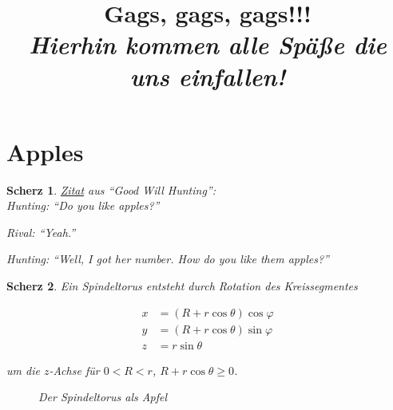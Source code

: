 \documentclass{article}
\title
{
  Gags, gags, gags!!! \\
  \vspace{4pt}
  \normalsize
  \textit{Hierhin kommen alle Späße die uns einfallen!}
}
\author{}
\date{}
\newtheorem{gag}{Scherz}[section]
\begin{document}
\maketitle

\section{Apples}

\begin{gag}

  \href{https://knowyourphrase.com/how-do-you-like-them-apples}{Zitat} aus \enquote{Good Will Hunting}: \\

  Hunting:
  \enquote{Do you like apples?}

  Rival:
  \enquote{Yeah.}

  Hunting:
  \enquote{Well, I got her number. How do you like them apples?}

\end{gag}

\begin{gag}

  Ein \textit{Spindeltorus} entsteht durch Rotation des Kreissegmentes

  \begin{align*}
    x & = (R + r \cos{\theta}) \cos{\varphi} \\
    y & = (R + r \cos{\theta}) \sin{\varphi} \\
    z & = r \sin{\theta}
  \end{align*}

  um die $z$-Achse für $0 < R < r$, $R + r \cos{\theta} \geq 0$.

  \begin{figure}[H]
    \centering
    \hspace{0mm}
    \caption{Der Spindeltorus als Apfel}
    \label{fig:apfel_apple}
  \end{figure}

\end{gag}
\end{document}
